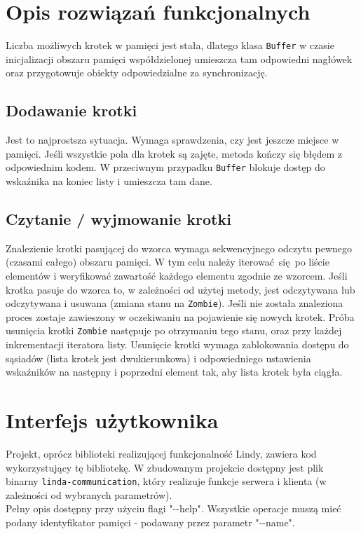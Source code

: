 \documentclass[a4paper]{article}
\begin{document}
	\section{Opis rozwiązań funkcjonalnych}
	Liczba możliwych krotek w pamięci jest stała, dlatego klasa \texttt{Buffer} w czasie inicjalizacji obszaru pamięci współdzielonej umieszcza tam odpowiedni nagłówek oraz przygotowuje obiekty odpowiedzialne za synchronizację.
	
	\subsection{Dodawanie krotki}
	Jest to najprostsza sytuacja. Wymaga sprawdzenia, czy jest jeszcze miejsce w pamięci.
	Jeśli wszystkie pola dla krotek są zajęte, metoda kończy się błędem z odpowiednim kodem.
	W przeciwnym przypadku \texttt{Buffer} blokuje dostęp do wskaźnika na koniec listy i umieszcza tam dane.
	
	\subsection{Czytanie / wyjmowanie krotki}
	Znalezienie krotki pasującej do wzorca wymaga sekwencyjnego odczytu pewnego (czasami całego) obszaru pamięci.
	W tym celu należy iterować się po liście elementów i weryfikować zawartość każdego elementu zgodnie ze wzorcem.
    Jeśli krotka pasuje do wzorca to, w zależności od użytej metody, jest odczytywana lub odczytywana i usuwana (zmiana stanu na \texttt{Zombie}).
	Jeśli nie została znaleziona proces zostaje zawieszony w oczekiwaniu na pojawienie się nowych krotek.
    Próba usunięcia krotki \texttt{Zombie} następuje po otrzymaniu tego stanu, oraz przy każdej inkrementacji iteratora listy.
	Usunięcie krotki wymaga zablokowania dostępu do sąsiadów (lista krotek jest dwukierunkowa) i odpowiedniego ustawienia wskaźników na następny i poprzedni element tak, aby lista krotek była ciągła. 
		
	\section{Interfejs użytkownika}
	Projekt, oprócz biblioteki realizującej funkcjonalność Lindy, zawiera kod wykorzystujący tę bibliotekę. W zbudowanym projekcie dostępny jest plik binarny \texttt{linda-communication}, który realizuje funkcje serwera i klienta (w zależności od wybranych parametrów).
	\\
	Pełny opis dostępny przy użyciu flagi "-{}-help". Wszystkie operacje muszą mieć podany identyfikator pamięci - podawany przez parametr "-{}-name". \\
	
\end{document}
